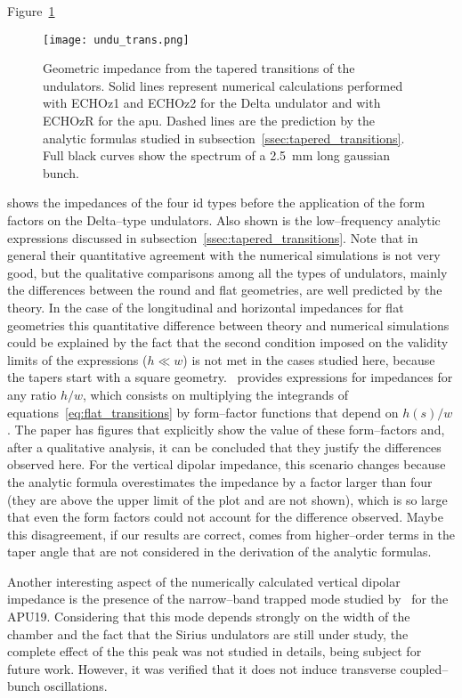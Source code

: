     Figure~\ref{fig:undu_trans}
    \begin{figure}
        \centering
        \texttt{[image: undu\_trans.png]}
        \caption[Geometric impedance from the tapered transitions of the undulators.]{Geometric impedance from the tapered transitions of the undulators. Solid lines represent numerical calculations performed with ECHOz1 and ECHOz2 for the Delta undulator and with ECHOzR for the \gls{apu}. Dashed lines are the prediction by the analytic formulas studied in subsection~\ref{ssec:tapered_transitions}. Full black curves show the spectrum of a \SI{2.5}{\milli\meter} long gaussian bunch.}
        \label{fig:undu_trans}
    \end{figure}
    shows the impedances of the four \gls{id} types before the application of the form factors on the Delta--type undulators. Also shown is the low--frequency analytic expressions discussed in subsection~\ref{ssec:tapered_transitions}. Note that in general their quantitative agreement with the numerical simulations is not very good, but the qualitative comparisons among all the types of undulators, mainly the differences between the round and flat geometries, are well predicted by the theory. In the case of the longitudinal and horizontal impedances for flat geometries this quantitative difference between theory and numerical simulations could be explained by the fact that the second condition imposed on the validity limits of the expressions ($h\ll w$) is not met in the cases studied here, because the tapers start with a square geometry.~ provides expressions for impedances for any ratio $h/w$, which consists on multiplying the integrands of equations~\eqref{eq:flat_transitions} by form--factor functions that depend on $h(s)/w$. The paper has figures that explicitly show the value of these form--factors and, after a qualitative analysis, it can be concluded that they justify the differences observed here. For the vertical dipolar impedance, this scenario changes because the analytic formula overestimates the impedance by a factor larger than four (they are above the upper limit of the plot and are not shown), which is so large that even the form factors could not account for the difference observed. Maybe this disagreement, if our results are correct, comes from higher--order terms in the taper angle that are not considered in the derivation of the analytic formulas.

    Another interesting aspect of the numerically calculated vertical dipolar impedance is the presence of the narrow--band trapped mode studied by~ for the APU19. Considering that this mode depends strongly on the width of the chamber and the fact that the Sirius undulators are still under study, the complete effect of the this peak was not studied in details, being subject for future work. However, it was verified that it does not induce transverse coupled--bunch oscillations.

